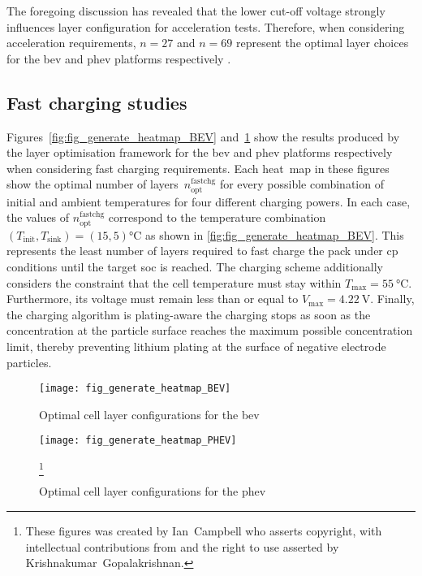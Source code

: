 The foregoing  discussion has revealed  that the lower cut-off  voltage strongly
influences  layer   configuration  for   acceleration  tests.   Therefore,  when
considering acceleration requirements, $n = 27$ and $n=69$ represent the optimal
layer choices for the \gls{bev} and \gls{phev} platforms respectively .

\subsection{Fast charging studies}

Figures~\ref{fig:fig_generate_heatmap_BEV}
and~\ref{fig:fig_generate_heatmap_PHEV} show  the results produced by  the layer
optimisation framework  for the \gls{bev} and  \gls{phev} platforms respectively
when considering fast charging requirements. Each heat~map in these figures show
the optimal  number of  layers~$n^\text{fastchg}_\text{opt}$ for  every possible
combination  of initial  and ambient  temperatures for  four different  charging
powers. In each case, the  values of $n^\text{fastchg}_\text{opt}$ correspond to
the  temperature  combination  \mbox{$(T_\text{init},T_\text{sink})  =  (15,  5)
\si{\degreeCelsius}$}  as  shown  in  \cref{fig:fig_generate_heatmap_BEV}.  This
represents the  least number of  layers required to  fast charge the  pack under
\gls{cp} conditions until  the target \gls{soc} is reached.  The charging scheme
additionally considers the constraint that the cell temperature must stay within
\mbox{$T_\text{max}=  \SI{55}{\degreeCelsius}$}. Furthermore,  its voltage  must
remain less than or equal  to \mbox{$V_\text{max} = \SI{4.22}{\volt}$}. Finally,
the charging algorithm is plating-aware \ie{}  the charging stops as soon as the
concentration at the particle surface reaches the maximum possible concentration
limit, thereby preventing  lithium plating at the surface  of negative electrode
particles.

\begin{figure}[p]
    \begin{minipage}[t]{\textwidth}
        \centering
        \texttt{[image: fig\_generate\_heatmap\_BEV]}
        \captionsetup{labelsep=note}
        \caption[Optimal cell layer configurations for the \gls{bev}, presented for a range of fast charging powers and thermal conditions]{Optimal cell layer configurations for the \gls{bev}}
        \label{fig:fig_generate_heatmap_BEV}
        \setcounter{footnote}{9}
        \vspace*{\floatsep}
        \texttt{[image: fig\_generate\_heatmap\_PHEV]}
        \caption[Optimal cell layer configurations for the \gls{phev}, presented for a range of
        fast charging powers and thermal conditions]{Optimal cell layer configurations for the \gls{phev}}
        \label{fig:fig_generate_heatmap_PHEV}
        \mpfootnotes[1]
        \footnote{These figures was created by \mbox{Ian Campbell} who asserts copyright,
            with intellectual contributions from and the right to use asserted by
        \mbox{Krishnakumar Gopalakrishnan}.}
    \end{minipage}
\end{figure}

